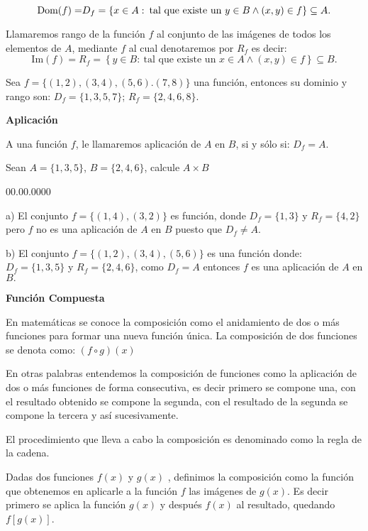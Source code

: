 \[
\mbox{Dom\ensuremath{\left(f\right)=}}D_{f}=\left\{ x\in A:\:\mbox{tal que existe un }y\in B\wedge\left(x,y\right)\in f\right\} \subseteq A.
\]

Llamaremos rango de la función $f$ al conjunto de las imágenes de
todos los elementos de $A$, mediante $f$ al cual denotaremos por
$R_{f}$ es decir: 
\[
\mbox{Im}\ensuremath{\left(f\right)=}R_{f}=\left\{ y\in B:\:\mbox{tal que existe un }x\in A\wedge\left(x,y\right)\in f\right\} \subseteq B.
\]

\begin{ejemplo} Sea $f=\{(1,2),(3,4),(5,6).(7,8)\}$ una función,
entonces su dominio y rango son: $D_{f}=\{1,3,5,7\}$; $R_{f}=\{2,4,6,8\}.$\end{ejemplo} 

\textbf{\noindent Aplicación}

A una función $f$, le llamaremos aplicación de $A$ en $B$, si y
sólo si: $D_{f}=A$. 

\begin{ejemplo} Sean $A=\{1,3,5\}$, $B=\{2,4,6\}$, calcule $A\times B$ 
\begin{lyxlist}{00.00.0000}
\item [{a)}] El conjunto $f=\{(1,4),(3,2)\}$ es función, donde $D_{f}=\{1,3\}$
y $R_{f}=\{4,2\}$ pero $f$ no es una aplicación de $A$ en $B$
puesto que $D_{f}\neq A.$
\item [{b)}] El conjunto $f=\{(1,2),(3,4),(5,6)\}$ es una función donde:
$D_{f}=\{1,3,5\}$ y $R_{f}=\{2,4,6\}$, como $D_{f}=A$ entonces
$f$ es una aplicación de $A$ en $B.$
\end{lyxlist}
\end{ejemplo}

\textbf{\noindent Función Compuesta}

En matemáticas se conoce la composición como el anidamiento de dos
o más funciones para formar una nueva función única. La composición
de dos funciones se denota como: $\left(f\circ g\right)\left(x\right)$

En otras palabras entendemos la composición de funciones como la aplicación
de dos o más funciones de forma consecutiva, es decir primero se compone
una, con el resultado obtenido se compone la segunda, con el resultado
de la segunda se compone la tercera y así sucesivamente. 

El procedimiento que lleva a cabo la composición es denominado como
la regla de la cadena.

Dadas dos funciones $f(x)$ y $g(x)$ , definimos la composición como
la función que obtenemos en aplicarle a la función $f$ las imágenes
de $g(x)$. Es decir primero se aplica la función $g(x)$ y después
$f(x)$ al resultado, quedando $f\left[g\left(x\right)\right]$. 


